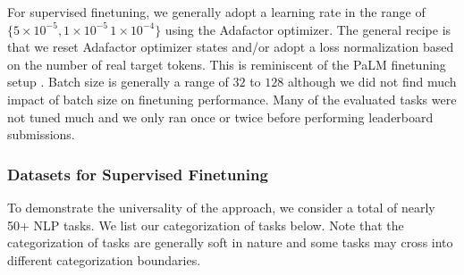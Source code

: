 \documentclass[10pt]{article}
\begin{document}
For supervised finetuning, we generally adopt a learning rate in the range of $\{5 \times 10^{-5}, 1 \times 10^{-5}\,  1 \times 10^{-4}\}$ using the Adafactor optimizer. The general recipe is that we reset Adafactor optimizer states and/or adopt a loss normalization based on the number of real target tokens. This is reminiscent of the PaLM finetuning setup \citep{chowdhery2022palm}. Batch size is generally a range of $32$ to $128$ although we did not find much impact of batch size on finetuning performance. Many of the evaluated tasks were not tuned much and we only ran once or twice before performing leaderboard submissions.  

\subsubsection{Datasets for Supervised Finetuning}
To demonstrate the universality of the approach, we consider a total of nearly 50+ NLP tasks. We list our categorization of tasks below. Note that the categorization of tasks are generally soft in nature and some tasks may cross into different categorization boundaries.
\end{document}
